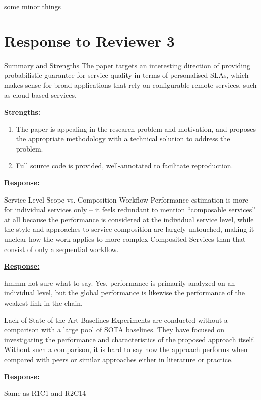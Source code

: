 \documentclass{article}
\newcommand{\Response}[1][]{%
    \noindent\underline{\textbf{Response:}}\par\vspace{0.2cm}%
    #1\par\vspace{0.6cm}%
}
\begin{document}
some minor things

\newpage
\section{Response to Reviewer 3}

\begin{cmt*}{Summary and Strengths}{}
The paper targets an interesting direction of providing probabilistic guarantee for service quality in terms of personalised SLAs, which makes sense for broad applications that rely on configurable remote services, such as cloud-based services.

\textbf{Strengths:}
\begin{enumerate}[noitemsep,topsep=0pt]
    \item The paper is appealing in the research problem and motivation, and proposes the appropriate methodology with a technical solution to address the problem.
    \item Full source code is provided, well-annotated to facilitate reproduction.
\end{enumerate}
\end{cmt*}

\Response

\begin{cmt}{Service Level Scope vs. Composition Workflow}{}
Performance estimation is more for individual services only -- it feels redundant to mention ``composable services'' at all because the performance is considered at the individual service level, while the style and approaches to service composition are largely untouched, making it unclear how the work applies to more complex Composited Services than that consist of only a sequential workflow.
\end{cmt}
\Response

hmmm not sure what to say. Yes, performance is primarily analyzed on an individual level, but the global performance is likewise the performance of the weakest link in the chain.

\begin{cmt}{Lack of State-of-the-Art Baselines}{}
Experiments are conducted without a comparison with a large pool of SOTA baselines. They have focused on investigating the performance and characteristics of the proposed approach itself. Without such a comparison, it is hard to say how the approach performs when compared with peers or similar approaches either in literature or practice.
\end{cmt}
\Response

Same as R1C1 and R2C14
\end{document}
